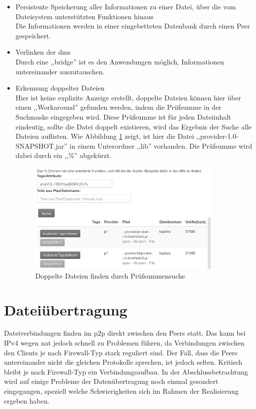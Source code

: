 \documentclass[oneside, ngerman, toc=bibliography,bibliography=totoc,listof=entryprefix, open=right,numbers=noenddot,fontsize=12pt]{scrbook}
\begin{document}
\begin{itemize}
         
      \item Persistente Speicherung aller Informationen zu einer Datei, über die vom Dateisystem unterstützten Funktionen hinaus\\
      Die Informationen werden in einer eingebetteten Datenbank durch einen Peer gespeichert.
    \item Verlinken der \acrshort{dms}\\
    Durch eine ,,bridge'' ist es den Anwendungen möglich, Informationen untereinander auszutauschen. 
    \item Erkennung doppelter Dateien\\
    Hier ist keine explizite Anzeige erstellt, doppelte Dateien können hier über einen ,,Workaround'' gefunden werden, indem die Prüfsumme in der Suchmaske eingegeben wird. Diese Prüfsumme ist für jeden Dateiinhalt eindeutig, sollte die Datei doppelt existieren, wird das Ergebnis der Suche alle Dateien auflisten. Wie Abbildung \ref{fig:app-dups} zeigt, ist hier die Datei ,,provider-1.0-SNAPSHOT.jar'' in einem Unterordner ,,lib'' vorhanden. Die Prüfsumme wird dabei durch ein ,,\%'' abgekürzt.
    
    \begin{figure}[htbp] 
        \centering
        \includegraphics[width=0.9\textwidth]{Masterarbeit_Bilder/suchedups.png}
        \caption{Doppelte Dateien finden durch Prüfsummensuche}
        \label{fig:app-dups}
    \end{figure}  
    
    
    
\end{itemize}



\section{Dateiübertragung}
Dateiverbindungen finden im \acrshort{p2p} direkt zwischen den Peers statt.
Das kann bei IPv4 wegen \acrshort{nat} jedoch schnell zu Problemen führen, da Verbindungen zwischen den Clients je nach Firewall-Typ stark reguliert sind. Der Fall, dass die Peers untereinander nicht die gleichen Protokolle sprechen, ist jedoch selten. Kritisch bleibt je nach Firewall-Typ ein Verbindungsaufbau. In der Abschlussbetrachtung wird auf einige Probleme der Datenübertragung noch einmal gesondert eingegangen, speziell welche Schwierigkeiten sich im Rahmen der Realisierung ergeben haben.
\end{document}
